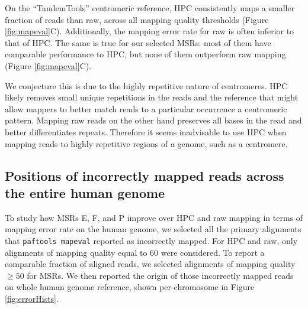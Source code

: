 \documentclass[
  11pt,
  twoside,
  BCOR=10mm,
  listof=totoc]{scrbook}
\begin{document}
On the ``TandemTools'' centromeric reference, HPC consistently maps a smaller fraction of reads than raw, across all mapping quality thresholds (Figure \ref{fig:mapeval}C). Additionally, the mapping error rate for raw is often inferior to that of HPC. The same is true for our selected MSRs: most of them have comparable performance to HPC, but none of them outperform raw mapping (Figure \ref{fig:mapeval}C).

We conjecture this is due to the highly repetitive nature of centromeres. HPC likely removes small unique repetitions in the reads and the reference that might allow mappers to better match reads to a particular occurrence a centromeric pattern. Mapping raw reads on the other hand preserves all bases in the read and better differentiates repeats. Therefore it seems inadvisable to use HPC when mapping reads to highly repetitive regions of a genome, such as a centromere.

\hypertarget{positions-of-incorrectly-mapped-reads-across-the-entire-human-genome}{%
\subsection{Positions of incorrectly mapped reads across the entire human genome}\label{positions-of-incorrectly-mapped-reads-across-the-entire-human-genome}}

To study how MSRs E, F, and P improve over HPC and raw mapping in terms of mapping error rate on the human genome, we selected all the primary alignments that \texttt{paftools\ mapeval} reported as incorrectly mapped. For HPC and raw, only alignments of mapping quality equal to 60 were considered. To report a comparable fraction of aligned reads, we selected alignments of mapping quality \(\geq50\) for MSRs. We then reported the origin of those incorrectly mapped reads on whole human genome reference, shown per-chromosome in Figure \ref{fig:errorHists}.
\end{document}
